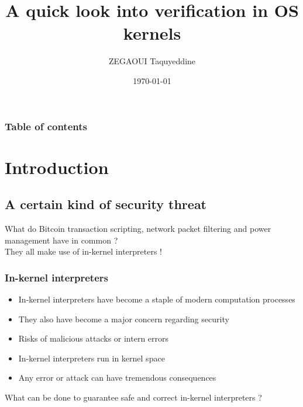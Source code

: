 \documentclass{beamer}
\begin{document}
\title{A quick look into verification in OS kernels}  
\author{ZEGAOUI Taquyeddine}
\date{\today} 
\begin{frame}
\titlepage
\end{frame}

\begin{frame}\frametitle{Table of contents}\tableofcontents
\end{frame} 


\section{Introduction}

\subsection{A certain kind of security threat}

\begin{frame}
What do Bitcoin transaction scripting, network packet filtering  and power management have in common ?
\\
\pause
They all make use of in-kernel interpreters !
\end{frame}

\begin{frame}\frametitle{In-kernel interpreters}
\begin{itemize}[<+->]
	\item In-kernel interpreters have become a staple of modern computation processes
	\item They also have become a major concern regarding security
	\item Risks of malicious attacks or intern errors
	\item In-kernel interpreters run in kernel space
	\item Any error or attack can have tremendous consequences
 \end{itemize}
\pause
What can be done to guarantee safe and correct in-kernel interpreters ?
\end{frame}
\end{document}
